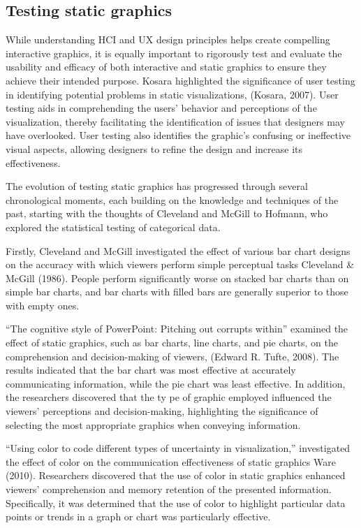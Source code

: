 \documentclass[print]{nuthesis}
\begin{document}
\hypertarget{testing-static-graphics}{%
\subsection{Testing static graphics}\label{testing-static-graphics}}

While understanding HCI and UX design principles helps create compelling interactive graphics, it is equally important to rigorously test and evaluate the usability and efficacy of both interactive and static graphics to ensure they achieve their intended purpose.
Kosara highlighted the significance of user testing in identifying potential problems in static visualizations, (Kosara, 2007).
User testing aids in comprehending the users' behavior and perceptions of the visualization, thereby facilitating the identification of issues that designers may have overlooked.
User testing also identifies the graphic's confusing or ineffective visual aspects, allowing designers to refine the design and increase its effectiveness.

The evolution of testing static graphics has progressed through several chronological moments, each building on the knowledge and techniques of the past, starting with the thoughts of Cleveland and McGill to Hofmann, who explored the statistical testing of categorical data.

Firstly, Cleveland and McGill investigated the effect of various bar chart designs on the accuracy with which viewers perform simple perceptual tasks Cleveland \& McGill (1986).
People perform significantly worse on stacked bar charts than on simple bar charts, and bar charts with filled bars are generally superior to those with empty ones.

``The cognitive style of PowerPoint: Pitching out corrupts within'' examined the effect of static graphics, such as bar charts, line charts, and pie charts, on the comprehension and decision-making of viewers, (Edward R. Tufte, 2008).
The results indicated that the bar chart was most effective at accurately communicating information, while the pie chart was least effective.
In addition, the researchers discovered that the ty pe of graphic employed influenced the viewers' perceptions and decision-making, highlighting the significance of selecting the most appropriate graphics when conveying information.

``Using color to code different types of uncertainty in visualization,'' investigated the effect of color on the communication effectiveness of static graphics Ware (2010).
Researchers discovered that the use of color in static graphics enhanced viewers' comprehension and memory retention of the presented information.
Specifically, it was determined that the use of color to highlight particular data points or trends in a graph or chart was particularly effective.
\end{document}
